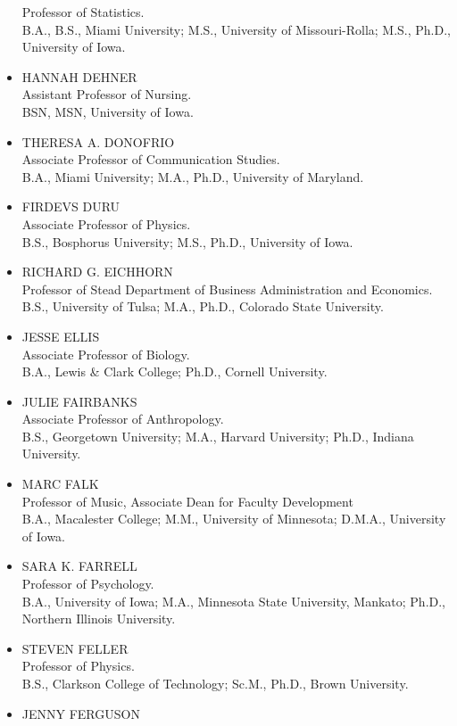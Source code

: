 \documentclass[
  letterpaper,
]{scrbook}
\begin{document}
\begin{itemize}
  Professor of Statistics.\\
  B.A., B.S., Miami University; M.S., University of Missouri-Rolla;
  M.S., Ph.D., University of Iowa.
\item
  HANNAH DEHNER\\
  Assistant Professor of Nursing.\\
  BSN, MSN, University of Iowa.
\item
  THERESA A. DONOFRIO\\
  Associate Professor of Communication Studies.\\
  B.A., Miami University; M.A., Ph.D., University of Maryland.
\item
  FIRDEVS DURU\\
  Associate Professor of Physics.\\
  B.S., Bosphorus University; M.S., Ph.D., University of Iowa.
\item
  RICHARD G. EICHHORN\\
  Professor of Stead Department of Business Administration and
  Economics.\\
  B.S., University of Tulsa; M.A., Ph.D., Colorado State University.
\item
  JESSE ELLIS\\
  Associate Professor of Biology.\\
  B.A., Lewis \& Clark College; Ph.D., Cornell University.
\item
  JULIE FAIRBANKS\\
  Associate Professor of Anthropology.\\
  B.S., Georgetown University; M.A., Harvard University; Ph.D., Indiana
  University.
\item
  MARC FALK\\
  Professor of Music, Associate Dean for Faculty Development\\
  B.A., Macalester College; M.M., University of Minnesota; D.M.A.,
  University of Iowa.
\item
  SARA K. FARRELL\\
  Professor of Psychology.\\
  B.A., University of Iowa; M.A., Minnesota State University, Mankato;
  Ph.D., Northern Illinois University.
\item
  STEVEN FELLER\\
  Professor of Physics.\\
  B.S., Clarkson College of Technology; Sc.M., Ph.D., Brown University.
\item
  JENNY FERGUSON\\

\end{itemize}
\end{document}
